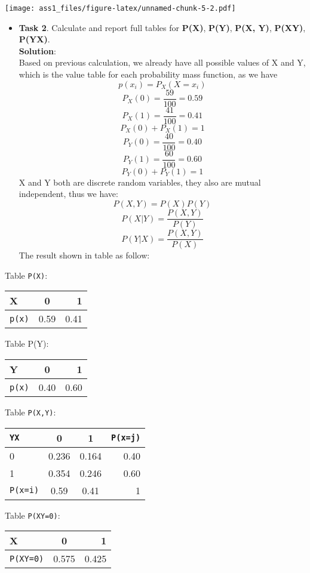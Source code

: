 \documentclass[]{article}
\providecommand{\tightlist}{%
  \setlength{\itemsep}{0pt}\setlength{\parskip}{0pt}}
\begin{document}
\texttt{[image: ass1\_files/figure-latex/unnamed-chunk-5-2.pdf]}

\begin{itemize}
\tightlist
\item
  \textbf{Task 2}. Calculate and report full tables for \textbf{P(X)},
  \textbf{P(Y)}, \textbf{P(X, Y)}, \textbf{P(X\textbar{}Y)},
  \textbf{P(Y\textbar{}X)}.\\
  \textbf{Solution}:\\
  Based on previous calculation, we already have all possible values of
  X and Y, which is the value table for each probability mass function,
  as we have \[ p(x_{i})=P_{ X }(X=x_{i}) \]
  \[ P_{ X }( 0 )=\frac { 59 }{ 100 } =0.59 \]
  \[ P_{ X }( 1 )=\frac { 41 }{ 100 } =0.41 \]
  \[ P_{ X }( 0 )+P_{ X }(1)=1\]
  \[ P_{ Y }( 0 )=\frac { 40 }{ 100 } =0.40 \]
  \[ P_{ Y }( 1 )=\frac { 60 }{ 100 } =0.60 \]
  \[ P_{ Y }( 0 )+P_{ Y }(1)=1\] X and Y both are discrete random
  variables, they also are mutual independent, thus we have:
  \[P(X,Y)=P(X)P(Y)\] \[ P( X|Y )=\frac { P(X,Y) }{ P(Y) } \]
  \[ P( Y|X )=\frac { P(X,Y) }{ P(X) } \] The result shown in table as
  follow:
\end{itemize}

Table \texttt{P(X)}:

\begin{longtable}[]{@{}lcr@{}}
\toprule
X & 0 & 1\tabularnewline
\midrule
\endhead
\texttt{p(x)} & 0.59 & 0.41\tabularnewline
\bottomrule
\end{longtable}

Table P(Y):

\begin{longtable}[]{@{}lcr@{}}
\toprule
Y & 0 & 1\tabularnewline
\midrule
\endhead
\texttt{p(x)} & 0.40 & 0.60\tabularnewline
\bottomrule
\end{longtable}

Table \texttt{P(X,Y)}:

\begin{longtable}[]{@{}lccr@{}}
\toprule
\texttt{Y\textbar{}X} & 0 & 1 & \texttt{P(x=j)}\tabularnewline
\midrule
\endhead
0 & 0.236 & 0.164 & 0.40\tabularnewline
1 & 0.354 & 0.246 & 0.60\tabularnewline
\texttt{P(x=i)} & 0.59 & 0.41 & 1\tabularnewline
\bottomrule
\end{longtable}

Table \texttt{P(X\textbar{}Y=0)}:

\begin{longtable}[]{@{}lcr@{}}
\toprule
X & 0 & 1\tabularnewline
\midrule
\endhead
\texttt{P(X\textbar{}Y=0)} & 0.575 & 0.425\tabularnewline
\bottomrule
\end{longtable}
\end{document}
